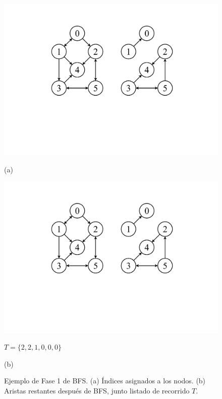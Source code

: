 \begin{figure}[b]
    	\centering
    	\begin{minipage}{0.45\textwidth}
    		\centering
    		\includegraphics[scale=.35, clip, trim=180 230 440 80 ]{img/arte/graphs-BFS-F1.pdf}
    		
    		(a)
    	\end{minipage}
    	\begin{minipage}{0.45\textwidth}
    		\centering
    		\includegraphics[scale=.35, clip, trim=450 230 170 80]{img/arte/graphs-BFS-F1.pdf}
    		
    		$T = \{2, 2, 1, 0, 0, 0\}$
    		
    		(b)
    	\end{minipage}

    \caption{Ejemplo de Fase 1 de BFS. (a) Índices asignados a los nodos. (b) Aristas restantes después de BFS, junto listado de recorrido $T$.}
    \label{fig:bfs1}
\end{figure}
